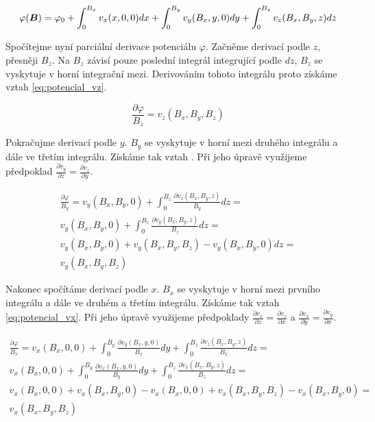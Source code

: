 \begin{equation}
\label{eq:potencial_7}
\varphi(\boldsymbol{B}) = \varphi_0 + \int_0^{B_x} v_x(x, 0, 0) dx + \int_0^{B_y} v_y(B_x, y, 0) dy  + \int_0^{B_z} v_z(B_x, B_y, z) dz
\end{equation}

Spočítejme nyní parciální derivace potenciálu \(\varphi\). Začněme derivací podle \(z\), přesněji \(B_z\). Na \(B_z\) závisí pouze poslední integrál
integrující podle \(dz\), \(B_z\) se vyskytuje v horní integrační mezi. Derivováním tohoto integrálu proto získáme vztah \eqref{eq:potencial_vz}.

\begin{equation}
\label{eq:potencial_vz}
\frac{\partial \varphi}{B_z} = v_z(B_x, B_y, B_z)
\end{equation}

Pokračujme derivací podle \(y\). \(B_y\) se vyskytuje v horní mezi druhého integrálu a dále ve třetím integrálu. Získáme tak vztah \label{eq:potencial_vy}.
Při jeho úpravě využijeme předpoklad \(\frac{\partial v_y}{\partial z} = \frac{\partial v_z}{\partial y}\).

\begin{equation}
\label{eq:potencial_vy}
\begin{split}
\frac{\partial \varphi}{B_y} = v_y(B_x, B_y, 0) + \int_0^{B_z} \frac{\partial v_z(B_x, B_y, z)}{B_y} dz = \\
v_y(B_x, B_y, 0) + \int_0^{B_z} \frac{\partial v_y(B_x, B_y, z)}{B_z} dz = \\
v_y(B_x, B_y, 0) + v_y(B_x, B_y, B_z) - v_y(B_x, B_y, 0) dz = \\
v_y(B_x, B_y, B_z)
\end{split}
\end{equation}

Nakonec spočítáme derivací podle \(x\). \(B_x\) se vyskytuje v horní mezi prvního integrálu a dále ve druhém a třetím integrálu. Získáme tak vztah \eqref{eq:potencial_vx}. Při jeho úpravě využijeme předpoklady \(\frac{\partial v_x}{\partial z} = \frac{\partial v_z}{\partial x}\) a
\(\frac{\partial v_x}{\partial y} = \frac{\partial v_y}{\partial x}\).

\begin{equation}
\label{eq:potencial_vx}
\begin{split}
\frac{\partial \varphi}{B_x} = v_x(B_x, 0, 0) + \int_0^{B_y} \frac{\partial v_y(B_x, y, 0)}{B_x} dy + \int_0^{B_z} \frac{\partial v_z(B_x, B_y, z)}{B_x} dz = \\
v_x(B_x, 0, 0) + \int_0^{B_y} \frac{\partial v_x(B_x, y, 0)}{B_y} dy + \int_0^{B_z} \frac{\partial v_x(B_x, B_y, z)}{B_z} dz = \\
v_x(B_x, 0, 0) + v_x(B_x, B_y, 0) - v_x(B_x, 0, 0) + v_x(B_x, B_y, B_z) - v_x(B_x, B_y, 0) = \\
v_x(B_x, B_y, B_z)
\end{split}
\end{equation}


